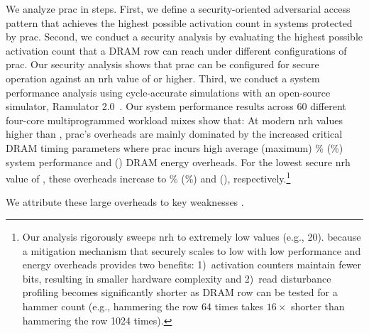 We analyze \gls{prac} in  steps.
First, we define a security-oriented adversarial access pattern that achieves the highest possible activation count in systems protected by \gls{prac}.
Second, we conduct a security analysis by evaluating the highest possible activation count that a DRAM row can reach under different configurations of \gls{prac}.
Our security analysis shows that \gls{prac} can be configured for secure operation against an \gls{nrh} value of  or higher.
Third, we conduct a system performance analysis using cycle-accurate simulations with an open-source simulator, Ramulator 2.0~\cite{luo2023ramulator2, ramulator2github}.
Our system performance results across 60 different four-core multiprogrammed workload mixes show that:
At modern \gls{nrh} values higher than , \gls{prac}'s overheads are mainly dominated by the increased critical DRAM timing parameters where \gls{prac} incurs high average (maximum) \% (\%) system performance and  () DRAM energy overheads.
For the lowest secure \gls{nrh} value of , these overheads increase to \% (\%) and  (), respectively.\footnote{Our analysis rigorously sweeps \gls{nrh} to extremely low values (e.g., 20).  because a mitigation mechanism that securely scales to low  with low performance and energy overheads provides two benefits:
1)~activation counters maintain fewer bits, resulting in smaller hardware complexity and
2)~read disturbance profiling becomes significantly shorter as  DRAM row can be tested for a  hammer count (e.g., hammering the row 64 times takes $16\times$ shorter than hammering the row 1024 times).}

We attribute these large overheads to  key weaknesses .

